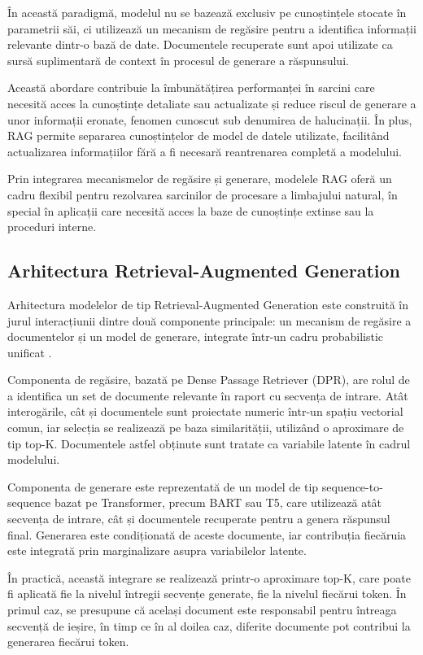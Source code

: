 \documentclass[12pt, a4paper, oneside, romanian]{teza-upb}
\begin{document}
În această paradigmă, modelul nu se bazează exclusiv pe cunoștințele stocate în parametrii săi, ci utilizează un mecanism de regăsire pentru a identifica informații relevante dintr-o bază de date. Documentele recuperate sunt apoi utilizate ca sursă suplimentară de context în procesul de generare a răspunsului.

Această abordare contribuie la îmbunătățirea performanței în sarcini care necesită acces la cunoștințe detaliate sau actualizate și reduce riscul de generare a unor informații eronate, fenomen cunoscut sub denumirea de halucinații. În plus, RAG permite separarea cunoștințelor de model de datele utilizate, facilitând actualizarea informațiilor fără a fi necesară reantrenarea completă a modelului.

Prin integrarea mecanismelor de regăsire și generare, modelele RAG oferă un cadru flexibil pentru rezolvarea sarcinilor de procesare a limbajului natural, în special în aplicații care necesită acces la baze de cunoștințe extinse \cite{lewis2020retrieval} sau la proceduri interne.


\subsection{Arhitectura Retrieval-Augmented Generation}

Arhitectura modelelor de tip Retrieval-Augmented Generation este construită în jurul interacțiunii dintre două componente principale: un mecanism de regăsire a documentelor și un model de generare, integrate într-un cadru probabilistic unificat \cite{lewis2020retrieval}.

Componenta de regăsire, bazată pe Dense Passage Retriever (DPR), are rolul de a identifica un set de documente relevante în raport cu secvența de intrare. Atât interogările, cât și documentele sunt proiectate numeric într-un spațiu vectorial comun, iar selecția se realizează pe baza similarității, utilizând o aproximare de tip top-K. Documentele astfel obținute sunt tratate ca variabile latente în cadrul modelului.

Componenta de generare este reprezentată de un model de tip sequence-to-sequence bazat pe Transformer, precum BART sau T5, care utilizează atât secvența de intrare, cât și documentele recuperate pentru a genera răspunsul final. Generarea este condiționată de aceste documente, iar contribuția fiecăruia este integrată prin marginalizare asupra variabilelor latente.

În practică, această integrare se realizează printr-o aproximare top-K, care poate fi aplicată fie la nivelul întregii secvențe generate, fie la nivelul fiecărui token. În primul caz, se presupune că același document este responsabil pentru întreaga secvență de ieșire, în timp ce în al doilea caz, diferite documente pot contribui la generarea fiecărui token.
\end{document}
